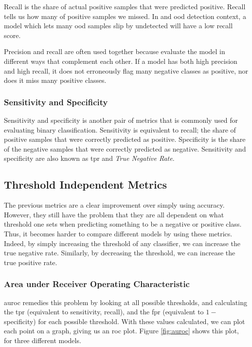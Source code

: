 \documentclass[UKenglish]{uiomasterthesis} %
\theoremstyle{definition}
\begin{document}
Recall is the share of actual positive samples that were predicted positive. Recall tells us how many of positive samples we missed. In and \ac{ood} detection context, a model which lets many \ac{ood} samples slip by undetected will have a low recall score.

Precision and recall are often used together because evaluate the model in different ways that complement each other. If a model has both high precision and high recall, it does not erroneously flag many negative classes as positive, nor does it miss many positive classes.

\subsubsection{Sensitivity and Specificity}

Sensitivity and specificity is another pair of metrics that is commonly used for evaluating binary classification. Sensitivity is equivalent to recall; the share of positive samples that were correctly predicted as positive. Specificity is the share of the negative samples that were correctly predicted as negative. Sensitivity and specificity are also known as \ac{tpr} and {\it True Negative Rate}.

\subsection{Threshold Independent Metrics}

The previous metrics are a clear improvement over simply using accuracy. However, they still have the problem that they are all dependent on what threshold one sets when predicting something to be a negative or positive class. Thus, it becomes harder to compare different models by using these metrics. Indeed, by simply increasing the threshold of any classifier, we can increase the true negative rate. Similarly, by decreasing the threshold, we can increase the true positive rate.\\

\subsubsection{Area under Receiver Operating Characteristic}

\ac{auroc} remedies this problem by looking at all possible thresholds, and calculating the \ac{tpr} (equivalent to sensitivity, recall), and the \ac{fpr} (equivalent to $1 -$ specificity) for each possible threshold. With these values calculated, we can plot each point on a graph, giving us an \ac{roc} plot. Figure \ref{fig:auroc} shows this plot, for three different models.
\end{document}
